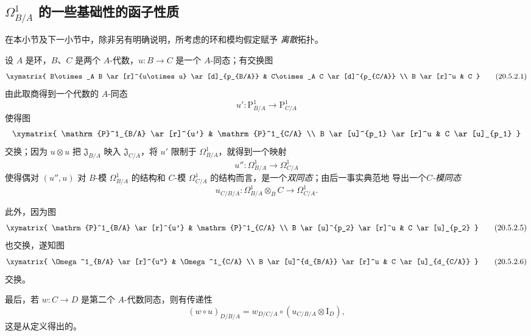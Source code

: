 \subsection{
\texorpdfstring{$\Omega^1_{B/A}$}{Omega1(B/A)} 的一些基础性的函子性质}
\label{subsection:0.20.5-fr}

\begin{env}[20.5.1]
\label{0.20.5.1-fr}
在本小节及下一小节中，除非另有明确说明，所考虑的环和模均假定赋予
\emph{离散}拓扑。
\end{env}

\begin{env}[20.5.2]
\label{0.20.5.2-fr}
设 $A$ 是环，$B$、$C$ 是两个 $A$-代数，$u:B\to C$ 是一个
$A$-同态；有交换图
\[
\xymatrix{
  B\otimes_A B \ar[r]^{u\otimes u} \ar[d]_{p_{B/A}} &
  C\otimes_A C \ar[d]^{p_{C/A}} \\
  B \ar[r]^u & C
}
\tag{20.5.2.1}
\label{0.20.5.2.1-fr}
\]
由此取商得到一个代数的 $A$-同态
\begin{equation}
\tag{20.5.2.2}
\label{0.20.5.2.2-fr}
  u':\mathrm{P}^1_{B/A}\to\mathrm{P}^1_{C/A}
\end{equation}
使得图
\[
\xymatrix{
  \mathrm{P}^1_{B/A} \ar[r]^{u'} & \mathrm{P}^1_{C/A} \\
  B \ar[u]^{p_1} \ar[r]^u & C \ar[u]_{p_1}
}
\]
交换；因为 $u\otimes u$ 把 $\mathfrak{J}_{B/A}$ 映入
$\mathfrak{J}_{C/A}$，将 $u'$ 限制于 $\Omega^1_{B/A}$，就得到一个映射
\begin{equation}
\tag{20.5.2.3}
\label{0.20.5.2.3-fr}
  u'':\Omega^1_{B/A}\to\Omega^1_{C/A}
\end{equation}
使得偶对 $(u'',u)$ 对 $B$-模 $\Omega^1_{B/A}$ 的结构和
$C$-模 $\Omega^1_{C/A}$ 的结构而言，是一个\emph{双同态}；由后一事实典范地
导出一个\emph{$C$-模同态}
\begin{equation}
\tag{20.5.2.4}
\label{0.20.5.2.4-fr}
  u_{C/B/A}:\Omega^1_{B/A}\otimes_B C\to\Omega^1_{C/A}.
\end{equation}

此外，因为图
\[
\xymatrix{
  \mathrm{P}^1_{B/A} \ar[r]^{u'} & \mathrm{P}^1_{C/A} \\
  B \ar[u]^{p_2} \ar[r]^u & C \ar[u]_{p_2}
}
\tag{20.5.2.5}
\label{0.20.5.2.5-fr}
\]
也交换，遂知图
\[
\xymatrix{
  \Omega^1_{B/A} \ar[r]^{u''} & \Omega^1_{C/A} \\
  B \ar[u]^{d_{B/A}} \ar[r]^u & C \ar[u]_{d_{C/A}}
}
\tag{20.5.2.6}
\label{0.20.5.2.6-fr}
\]
交换。

最后，若 $w:C\to D$ 是第二个 $A$-代数同态，则有传递性
\begin{equation}
\tag{20.5.2.7}
\label{0.20.5.2.7-fr}
  (w\circ u)_{D/B/A}
  =w_{D/C/A}\circ(u_{C/B/A}\otimes\mathrm{I}_D),
\end{equation}
这是从定义得出的。
\end{env}


